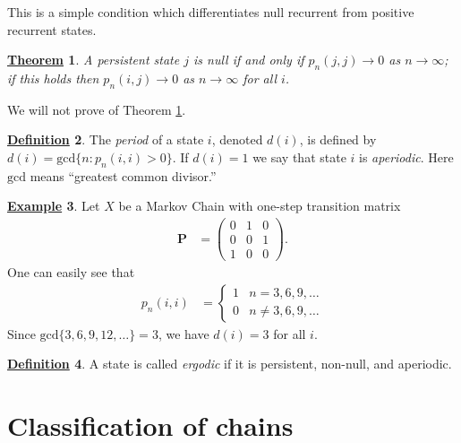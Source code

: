 \documentclass[12pt]{book}
\numberwithin{equation}{chapter}
\theoremstyle{plain}
\newtheorem{theorem}{\underline{Theorem}}
\numberwithin{theorem}{section}
\theoremstyle{definition}
\newtheorem{definition}[theorem]{\underline{Definition}}
\newtheorem{example}[theorem]{\underline{Example}}
\numberwithin{exercise}{chapter}
\newcommand{\<}{\langle}
\renewcommand{\>}{\rangle}
\renewcommand{\(}{\left(}
\renewcommand{\)}{\right)}
\renewcommand{\[}{\left[}
\renewcommand{\]}{\right]}
\newcommand\Pv{\pmb{P}}
\begin{document}
\noindent
This is a simple condition which differentiates null recurrent from positive recurrent states.

\begin{theorem}
\label{thm:null}
A persistent state $j$ is null if and only if $p_n(j,j) \to 0$ as $n \to \infty$; if this holds then $p_n(i,j) \to 0$ as $n \to \infty$ for all $i$.
\end{theorem}

\noindent
We will not prove of Theorem \ref{thm:null}.

\begin{definition}
The \emph{period} of a state $i$, denoted $d(i)$, is defined by
$d(i) = \text{gcd}\{ n : p_n(i,i)> 0 \}$.
If $d(i) = 1$ we say that state $i$ is \emph{aperiodic}.
Here $\text{gcd}$ means ``greatest common divisor.'' 
\end{definition}

\begin{example}
Let $X$ be a Markov Chain with one-step transition matrix
\begin{align}
\Pv
	&=	\( \begin{array}{ccc}
			0 & 1 & 0 \\
			0 & 0 & 1 \\
			1 & 0 & 0
			\end{array} \) .
\end{align}
One can easily see that
\begin{align}
p_n(i,i)
	&=	\left\{ \begin{array}{ll}
			1 & n=3, 6, 9, \ldots \\
			0 & n \neq 3, 6, 9, \ldots
			\end{array} \right.
\end{align}
Since $\text{gcd}\{3,6,9,12,\ldots\} = 3$, we have $d(i) = 3$ for all $i$.
\end{example}

\begin{definition}
A state is called \emph{ergodic} if it is persistent, non-null, and aperiodic.
\end{definition}


\section{Classification of chains}
\label{sec:chain.classification}
\end{document}

